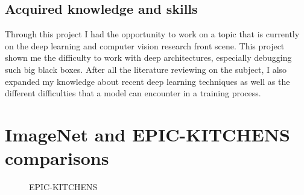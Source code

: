 \documentclass[12pt, a4paper]{report}
\begin{document}
		\section*{Acquired knowledge and skills}
			Through this project I had the opportunity to work on a topic that is currently on the deep learning and computer vision research front scene.
			This project shown me the difficulty to work with deep architectures, especially debugging such big black boxes.
			After all the literature reviewing on the subject, I also expanded my knowledge about recent deep learning techniques as well as the different difficulties that a model can encounter in a training process.

	
	
	\appendix
	\chapter{ImageNet and EPIC-KITCHENS comparisons}\label{appendix_a}
		\begin{figure}[h!]
			\hfill
			\caption{EPIC-KITCHENS}
		\end{figure}
\end{document}
